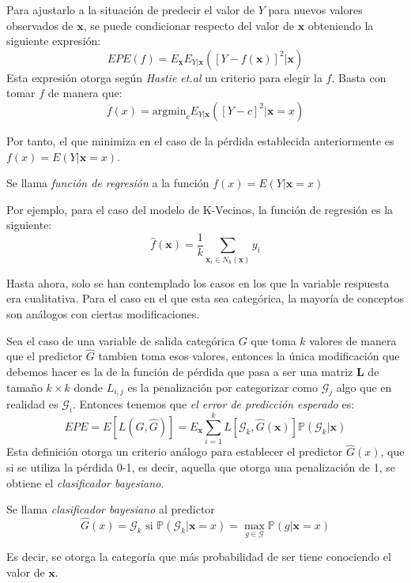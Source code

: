 \noindent Para ajustarlo a la situación de predecir el valor de $Y$ para nuevos valores observados de $\textbf{x}$, se puede condicionar respecto del valor de $\textbf{x}$ obteniendo la siguiente expresión:
\begin{equation}
 EPE(f) = E_{\textbf{x}} E_{Y|\textbf{x}}([Y-f(\textbf{x})]^2|\textbf{x})
\end{equation} 
Esta expresión otorga según \textit{Hastie et.al} \cite{Hastie 2001} un criterio para elegir la $f$. Basta con tomar $f$ de manera que: 
\begin{equation}
 f(x)=\text{argmin}_c E_{Y|\textbf{x}}([Y-c]^2|\textbf{x}=x)
\end{equation}

\noindent Por tanto, el que minimiza en el caso de la pérdida establecida anteriormente es $f(x)=E(Y|\textbf{x}=x)$. 
\begin{defi}
\noindent Se llama \textit{función de regresión} a la función $f(x)=E(Y|\textbf{x}=x)$
\end{defi}

\noindent Por ejemplo, para el caso del modelo de K-Vecinos, la función de regresión es la siguiente:
\begin{equation}
\hat{f}(\textbf{x})=\dfrac{1}{k}\sum_{\textbf{x}_i\in N_k(\textbf{x})} y_i 
\end{equation}

\noindent Hasta ahora, solo se han contemplado los casos en los que la variable respuesta era cualitativa. Para el caso en el que esta sea categórica, la mayoría de conceptos son análogos con ciertas modificaciones.

\noindent Sea el caso de una variable de salida categórica $G$ que toma $k$ valores de manera que el predictor $\hat{G}$ tambien toma esos valores, entonces la única modificación que debemos hacer es la de la función de pérdida que pasa a ser una matriz $\textbf{L}$ de tamaño $k\times k $ donde $L_{i,j}$ es la penalización por categorizar como $\mathcal{G}_j$ algo que en realidad es $\mathcal{G}_i$. Entonces tenemos que \textit{el error de predicción esperado} es: 
\begin{equation}
EPE = E[L(G,\hat{G})]= E_{\textbf{x}}\sum_{i=1}^k L[\mathcal{G}_k, \hat{G}(\textbf{x})]\mathbb{P}(\mathcal{G}_k|\textbf{x})
\end{equation} 
Esta definición otorga un criterio análogo para establecer el predictor $\hat{G}(x)$, que si se utiliza la pérdida 0-1, es decir, aquella que otorga una penalización de 1, se obtiene el \textit{clasificador bayesiano}.
\begin{defi}
Se llama \textit{clasificador bayesiano} al predictor 
\begin{equation}
\hat{G}(x)=\mathcal{G}_k \text{ si } \mathbb{P}(\mathcal{G}_k|\textbf{x}=x)=\max_{g\in \mathcal{G}}\mathbb{P}(g|\textbf{x}=x)
\end{equation}

\noindent Es decir, se otorga la categoría que más probabilidad de ser tiene conociendo el valor de $\textbf{x}$.
\end{defi}

